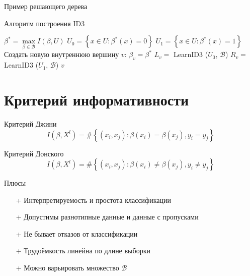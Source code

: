 \documentclass[10pt]{beamer}
\begin{document}
\begin{frame}{Пример решающего дерева}
\end{frame}

{
\begin{frame}{Алгоритм построения ID3}
  \begin{algorithmic}[1]
         \State {}
       \EndIf
       \State $\beta^* = \max\limits_{\beta \in \mathcal{B}} I(\beta, U)$
       \State $U_0 = \left\{ x \in U : \beta^*(x) = 0\right\}$	
       \State $U_1 = \left\{ x \in U : \beta^*(x) = 1\right\}$	
         \State {}
       \EndIf
       \State Создать новую внутреннюю вершину $v$: $\beta_v = \beta^*$
       \State $L_v =$ LearnID3 ($U_0$, $\mathcal{B}$)
       \State $R_v =$ LearnID3 ($U_1$, $\mathcal{B}$)
       \State \Return $v$
    \EndFunction
  \end{algorithmic}    
\end{frame}
}

\section{Критерий информативности}

\begin{frame}{Критерий Джини}
  $$I(\beta,X^l)= \# \left\{ (x_i, x_j): \beta(x_i) = \beta(x_j), y_i = y_j \right\}$$
\end{frame}

\begin{frame}{Критерий Донского}
  $$I(\beta,X^l)= \# \left\{ (x_i, x_j): \beta(x_i) \neq \beta(x_j), y_i \neq y_j \right\}$$
\end{frame}

\begin{frame}{Плюсы}
	\begin{enumerate}[<+- |alert@+>] 
	\item[+] Интерпретируемость и простота классификации
	\item[+] Допустимы разнотипные данные и данные с пропусками
	\item[+] Не бывает отказов от классификации
	\item[+] Трудоёмкость линейна по длине выборки
	\item[+] Можно варьировать множество $\mathcal{B}$
	\end{enumerate}
\end{frame}
\end{document}
